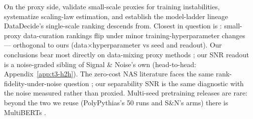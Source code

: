 On the proxy side, \citet{wortsman2023smallscale} validate small-scale proxies for training
instabilities, \citet{choshen2024hitchhiker} systematize scaling-law estimation, and
\citet{bhagia2025ladders} establish the model-ladder lineage DataDecide's single-scale
ranking descends from. Closest in question is \citet{wang2026proxy}: small-proxy data-curation rankings flip under minor training-hyperparameter changes --- orthogonal to ours (data$\times$hyperparameter vs seed and readout). Our conclusions bear most directly on
data-mixing proxy methods \citep{ye2024datamixing, liu2024regmix, xie2023doremi}; our SNR readout is a
noise-graded sibling of Signal \& Noise's own (head-to-head: Appendix~\ref{app:t3-h2h}).
The zero-cost NAS literature faces the same rank-fidelity-under-noise question
\citep{abdelfattah2021zero, white2021powerful}; our separability SNR is the same diagnostic
with the noise measured rather than proxied. Multi-seed pretraining releases are rare: beyond the two we reuse (PolyPythias's 50
runs and S\&N's arms) there is MultiBERTs \citep{sellam2022multiberts}.
